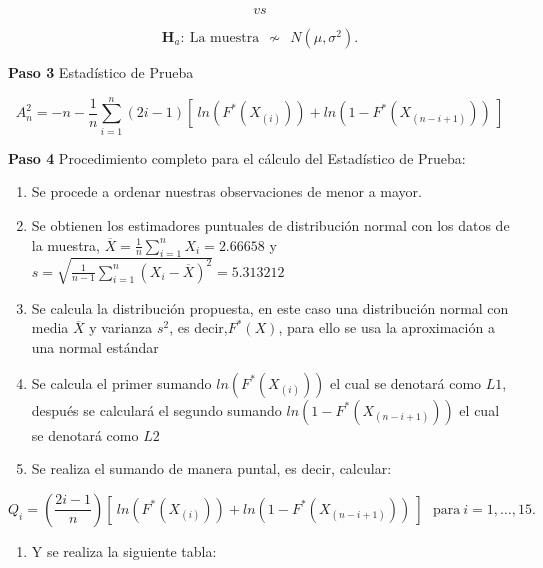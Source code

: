\documentclass[
  a4paper,
  oneside,
  openany]{book}
\providecommand{\tightlist}{%
  \setlength{\itemsep}{0pt}\setlength{\parskip}{0pt}}
\begin{document}
\[vs\]

\[\textbf{H}_a: \ \mbox{La muestra} \ \ \nsim \ \  N(\mu,\sigma^2).\]

\textbf{Paso 3} Estadístico de Prueba

\[A_n^2=-n-\frac{1}{n}\sum_{i=1}^{n}\left(2i-1\right)[ \ ln(F^*(X_{(i)})) +ln(1-F^*(X_{(n-i+1)})) \ ]\]

\textbf{Paso 4} Procedimiento completo para el cálculo del Estadístico de Prueba:

\begin{enumerate}
\def\labelenumi{\arabic{enumi})}
\item
  Se procede a ordenar nuestras observaciones de menor a mayor.
\item
  Se obtienen los estimadores puntuales de distribución normal con los datos de la muestra,
  \(\overline{X}=\frac{1}{n}\sum_{i=1}^{n}X_{i}= 2.66658\) y \(s=\sqrt{\frac{1}{n-1}\sum_{i=1}^{n}(X_{i}-\overline{X})^2}=5.313212\)
\item
  Se calcula la distribución propuesta, en este caso una distribución normal con media \(\overline{X}\) y varianza \(s^2\), es decir,\(F^*(X)\), para ello se usa la aproximación a una normal estándar
\item
  Se calcula el primer sumando \(ln(F^*(X_{(i)}))\) el cual se denotará como \(L1\), después se calculará el segundo sumando \(ln(1-F^*(X_{(n-i+1)}))\) el cual se denotará como \(L2\)
\item
  Se realiza el sumando de manera puntal, es decir, calcular:
\end{enumerate}

\[Q_{i}=\left(\frac{2i-1}{n}\right)[ \ ln(F^*(X_{(i)})) +ln(1-F^*(X_{(n-i+1)})) \ ] \ \ \ \mbox{para} \  i=1,\ldots,15.\]

\begin{enumerate}
\def\labelenumi{\arabic{enumi})}
\setcounter{enumi}{5}
\tightlist
\item
  Y se realiza la siguiente tabla:
\end{enumerate}
\end{document}
